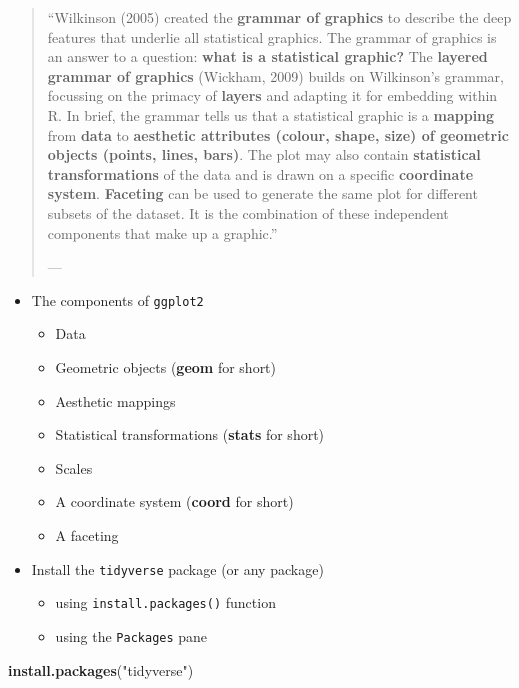 \documentclass[]{book}
\newenvironment{Shaded}{\begin{snugshade}}{\end{snugshade}}
\newcommand{\KeywordTok}[1]{\textcolor[rgb]{0.13,0.29,0.53}{\textbf{{#1}}}}
\newcommand{\StringTok}[1]{\textcolor[rgb]{0.31,0.60,0.02}{{#1}}}
\newcommand{\NormalTok}[1]{{#1}}
\providecommand{\tightlist}{%
  \setlength{\itemsep}{0pt}\setlength{\parskip}{0pt}}
\begin{document}
\begin{quote}
``Wilkinson (2005) created the \textbf{grammar of graphics} to describe
the deep features that underlie all statistical graphics. The grammar of
graphics is an answer to a question: \textbf{what is a statistical
graphic?} The \textbf{layered grammar of graphics} (Wickham, 2009)
builds on Wilkinson's grammar, focussing on the primacy of
\textbf{layers} and adapting it for embedding within R. In brief, the
grammar tells us that a statistical graphic is a \textbf{mapping} from
\textbf{data} to \textbf{aesthetic attributes (colour, shape, size) of
geometric objects (points, lines, bars)}. The plot may also contain
\textbf{statistical transformations} of the data and is drawn on a
specific \textbf{coordinate system}. \textbf{Faceting} can be used to
generate the same plot for different subsets of the dataset. It is the
combination of these independent components that make up a graphic.''

--- \citet{ggplot2}
\end{quote}

\begin{itemize}
\tightlist
\item
  The components of \texttt{ggplot2}

  \begin{itemize}
  \tightlist
  \item
    Data
  \item
    Geometric objects (\textbf{geom} for short)
  \item
    Aesthetic mappings
  \item
    Statistical transformations (\textbf{stats} for short)
  \item
    Scales
  \item
    A coordinate system (\textbf{coord} for short)
  \item
    A faceting
  \end{itemize}
\item
  Install the \texttt{tidyverse} package (or any package)

  \begin{itemize}
  \tightlist
  \item
    using \texttt{install.packages()} function
  \item
    using the \texttt{Packages} pane
  \end{itemize}
\end{itemize}

\begin{Shaded}
\begin{Highlighting}[]
\KeywordTok{install.packages}\NormalTok{(}\StringTok{"tidyverse"}\NormalTok{)}
\end{Highlighting}
\end{Shaded}
\end{document}
